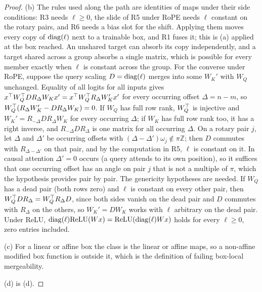 \begin{proof}
(b) The rules used along the path are identities of maps under their side conditions: R3 needs $\ell\ge0$, the slide of R5
under RoPE needs $\ell$ constant on the rotary pairs, and R6 needs a bias slot for the shift. Applying them moves every copy of
$\operatorname{diag}(\ell)$ next to a trainable box, and R1 fuses it; this is (a) applied at the box reached. An unshared target can absorb
its copy independently, and a target shared across a group absorbs a single matrix, which is possible for every member exactly
when $\ell$ is constant across the group. For the converse under RoPE, suppose the query scaling $D=\operatorname{diag}(\ell)$ merges into
some $W_K'$ with $W_Q$ unchanged. Equality of all logits for all inputs gives
$x^{\top} W_Q^{\top} DR_\Delta W_Kx'=x^{\top} W_Q^{\top} R_\Delta W_K'x'$ for every occurring offset $\Delta=n-m$, so
$W_Q^{\top}(R_\Delta W_K'-DR_\Delta W_K)=0$. If $W_Q$ has full row rank, $W_Q^{\top}$ is injective and $W_K'=R_{-\Delta}DR_\Delta W_K$ for
every occurring $\Delta$; if $W_K$ has full row rank too, it has a right inverse, and $R_{-\Delta}DR_\Delta$ is one matrix for
all occurring $\Delta$. On a rotary pair $j$, let $\Delta$ and $\Delta'$ be occurring offsets with $(\Delta-\Delta')\omega_j\notin\pi
\mathbb Z$; then $D$ commutes with $R_{\Delta-\Delta'}$ on that pair, and by the computation in R5, $\ell$ is constant on it. In
causal attention $\Delta'=0$ occurs (a query attends to its own position), so it suffices that one occurring offset has an angle
on pair $j$ that is not a multiple of $\pi$, which the hypothesis provides pair by pair. The genericity hypotheses are needed.
If $W_Q$ has a dead pair (both rows zero) and $\ell$ is constant on every other pair, then $W_Q^{\top} DR_\Delta=W_Q^{\top} R_\Delta D$,
since both sides vanish on the dead pair and $D$ commutes with $R_\Delta$ on the others, so $W_K'=DW_K$ works with $\ell$
arbitrary on the dead pair. Under ReLU, $\operatorname{diag}(\ell)\mathrm{ReLU}(Wx)=\mathrm{ReLU}(\operatorname{diag}(\ell)Wx)$ holds for every $\ell\ge0$,
zero entries included.

(c) For a linear or affine box the class is the linear or affine maps, so a non-affine modified box function is outside it,
which is the definition of failing box-local mergeability.

(d) is (d).
\end{proof}

